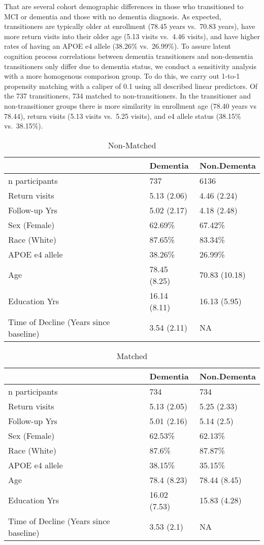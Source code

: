 \documentclass[
]{article}
\begin{document}
That are several cohort demographic differences in those who transitioned to MCI or dementia and those with no dementia diagnosis. As expected, transitioners are typically older at enrollment (78.45 years vs.~70.83 years), have more return visits into their older age (5.13 visits vs.~4.46 visits), and have higher rates of having an APOE e4 allele (38.26\% vs.~26.99\%). To assure latent cognition process correlations between dementia transitioners and non-dementia transitioners only differ due to dementia status, we conduct a sensitivity analysis with a more homogenous comparison group. To do this, we carry out 1-to-1 propensity matching with a caliper of 0.1 using all described linear predictors. Of the 737 transitioners, 734 matched to non-transitioners. In the transitioner and non-transitioner groups there is more similarity in enrollment age (78.40 years vs 78.44), return visits (5.13 visits vs.~5.25 visits), and e4 allele status (38.15\% vs.~38.15\%).

\begin{longtable}[t]{l|l|l}
\caption{\label{tab:unnamed-chunk-4}Non-Matched}\\
\hline
  & Dementia & Non.Dementa\\
\hline
n participants & 737 & 6136\\
\hline
Return visits & 5.13 (2.06) & 4.46 (2.24)\\
\hline
Follow-up Yrs & 5.02 (2.17) & 4.18 (2.48)\\
\hline
Sex (Female) & 62.69\% & 67.42\%\\
\hline
Race (White) & 87.65\% & 83.34\%\\
\hline
APOE e4 allele & 38.26\% & 26.99\%\\
\hline
Age & 78.45 (8.25) & 70.83 (10.18)\\
\hline
Education Yrs & 16.14 (8.11) & 16.13 (5.95)\\
\hline
Time of Decline
(Years since baseline) & 3.54 (2.11) & NA\\
\hline
\end{longtable}

\begin{longtable}[t]{l|l|l}
\caption{\label{tab:unnamed-chunk-4}Matched}\\
\hline
  & Dementia & Non.Dementa\\
\hline
n participants & 734 & 734\\
\hline
Return visits & 5.13 (2.05) & 5.25 (2.33)\\
\hline
Follow-up Yrs & 5.01 (2.16) & 5.14 (2.5)\\
\hline
Sex (Female) & 62.53\% & 62.13\%\\
\hline
Race (White) & 87.6\% & 87.87\%\\
\hline
APOE e4 allele & 38.15\% & 35.15\%\\
\hline
Age & 78.4 (8.23) & 78.44 (8.45)\\
\hline
Education Yrs & 16.02 (7.53) & 15.83 (4.28)\\
\hline
Time of Decline
(Years since baseline) & 3.53 (2.1) & NA\\
\hline
\end{longtable}
\end{document}
